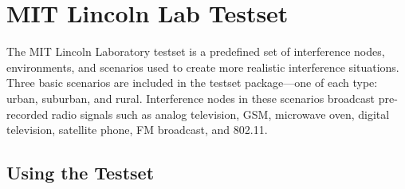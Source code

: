 %
%
%
%
%

\chapter{MIT Lincoln Lab Testset}

The MIT Lincoln Laboratory testset is a predefined set of
interference nodes, environments, and scenarios used to create more
realistic interference situations.  Three basic scenarios are
included in the testset package---one of each type: urban, suburban,
and rural. Interference nodes in these scenarios broadcast
pre-recorded radio signals such as analog television, GSM, microwave
oven, digital television, satellite phone, FM broadcast, and 802.11.

\section{Using the Testset}

